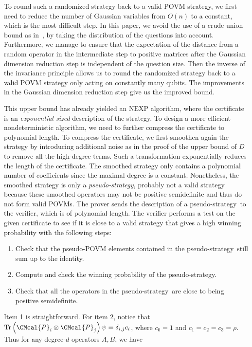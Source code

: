 \documentclass[11pt]{article}
\def\P{\CMcal{P}}
\theoremstyle{plain}
\theoremstyle{definition}
\newcommand {\br} [1] {\ensuremath{ \left( #1 \right) }}
\newcommand {\Tr} {\ensuremath{ \mathrm{Tr} }}
\newcommand{\pseudostrategy} {pseudo-strategy}
\newcommand{\1}{\mathbb{1}} %
\newcommand{\NEXP}{\mathrm{NEXP}}
\begin{document}
To round such a randomized strategy back to a valid POVM strategy, we first need to reduce the number of Gaussian variables from $O(n)$ to a constant, which is the most difficult step. 
In this paper, we avoid the use of a crude union bound as in~\cite{qin2021nonlocal}, by taking the distribution of the questions into account. 
Furthermore, we manage to ensure that the expectation of the distance from a random operator in the intermediate step to positive matrices after the Gaussian dimension reduction step is independent of the question size.
Then the inverse of the invariance principle allows us to round the randomized strategy back to a valid POVM strategy only acting on constantly many qubits. 
The improvements in the Gaussian dimension reduction step give us the improved bound.
 
 This upper bound has already yielded an $\NEXP$ algorithm, where the certificate is an {\em exponential-sized} description of the strategy. 
To design a more efficient nondeterministic algorithm, we need to further compress the certificate to polynomial length. 
To compress the certificate, we first smoothen again the strategy by introducing additional noise as in the proof of the upper bound of $D$ to remove all the high-degree terms.
Such a transformation exponentially reduces the length of the certificate. 
The smoothed strategy only contains a polynomial number of coefficients since the maximal degree is a constant. Nonetheless, the smoothed strategy is only a  {\em \pseudostrategy}, probably not a valid strategy because these smoothed operators may not be positive semidefinite and thus do not form valid POVMs. 
The prover sends the description of a \pseudostrategy~to the verifier, which is of polynomial length. The verifier performs a test on the given certificate to see if it is close to a valid strategy that gives a high winning probability with
the following steps:
\begin{enumerate}
  \item Check that the pseudo-POVM elements contained in the \pseudostrategy~still sum up to the identity.
  \item Compute and check the winning probability of the \pseudostrategy.
  \item Check that all the operators in the \pseudostrategy~are close to being positive semidefinite.
\end{enumerate}
Item 1 is straightforward. For item 2, notice that $\Tr\br{\P_i\otimes\P_j}\psi=\delta_{i,j} c_i$, where $c_0=1$ and $c_1=c_2=c_3=\rho$. Thus for any degree-$d$ operators $A,B$, we have 
\end{document}
